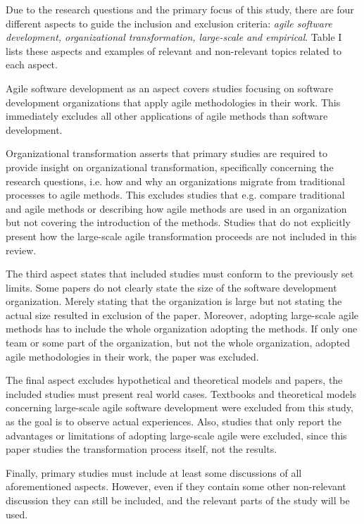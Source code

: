 
Due to the research questions and the primary focus of this study, there are
four different aspects to guide the inclusion and exclusion criteria:
\textit{agile software development, organizational transformation, large-scale
and empirical}. Table I lists these aspects and examples of relevant and
non-relevant topics related to each aspect.



Agile software development as an aspect covers studies focusing on
software development organizations that apply agile methodologies in
their work. This immediately excludes all other applications of agile
methods than software development.

Organizational transformation asserts that primary studies are required
to provide insight on organizational transformation, specifically
concerning the research questions, i.e. how and why an organizations
migrate from traditional processes to agile methods. This excludes
studies that e.g. compare traditional and agile methods or describing
how agile methods are used in an organization but not covering the
introduction of the methods. Studies that do not explicitly present how
the large-scale agile transformation proceeds are not included in this
review.

The third aspect states that included studies must conform to the
previously set limits. Some papers do not clearly state the size of the
software development organization. Merely stating that the organization
is large but not stating the actual size resulted in exclusion of the
paper. Moreover, adopting large-scale agile methods has to include the
whole organization adopting the methods. If only one team or some part
of the organization, but not the whole organization, adopted agile
methodologies in their work, the paper was excluded.

The final aspect excludes hypothetical and theoretical models
and papers, the included studies must present real world cases.
Textbooks and theoretical models concerning large-scale agile software
development were excluded from this study, as the goal is to observe
actual experiences. Also, studies that only report the advantages or
limitations of adopting large-scale agile were excluded, since this
paper studies the transformation process itself, not the results.

Finally, primary studies must include at least some discussions of
all aforementioned aspects. However, even if they contain some other
non-relevant discussion they can still be included, and the relevant
parts of the study will be used.
